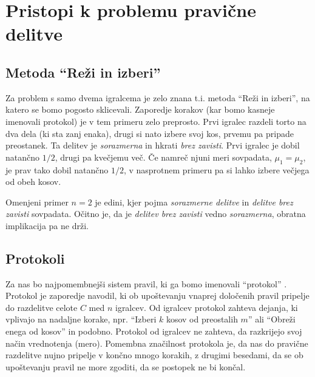 \documentclass[a4paper,12pt]{article}
\begin{document}
\section{Pristopi k problemu pravične delitve}

\subsection{Metoda ``Reži in izberi''}

Za problem s samo dvema igralcema je zelo znana t.i. metoda ``Reži in izberi'', na katero se bomo pogosto sklicevali. Zaporedje korakov (kar bomo kasneje imenovali protokol) je v tem primeru zelo preprosto. Prvi igralec razdeli torto na dva dela (ki sta zanj enaka), drugi si nato izbere svoj kos, prvemu pa pripade preostanek. Ta delitev je {\em sorazmerna\/} in hkrati {\em brez zavisti\/}. Prvi igralec je dobil natančno $1/2$, drugi pa kvečjemu več. Če namreč njuni meri sovpadata, $\mu_1 = \mu_2$, je prav tako dobil natančno $1/2$, v nasprotnem primeru pa si lahko izbere večjega od obeh kosov.

Omenjeni primer $n = 2$ je edini, kjer pojma {\em sorazmerne delitve\/} in {\em delitve brez zavisti\/} sovpadata. Očitno je, da je {\em delitev brez zavisti\/} vedno {\em sorazmerna\/}, obratna implikacija pa ne drži.

%
%
%

\subsection{Protokoli}

Za nas bo najpomembnejši sistem pravil, ki ga bomo imenovali ``protokol''  %
. Protokol je zaporedje navodil, ki ob upoštevanju vnaprej določenih pravil pripelje do razdelitve celote $C$ med $n$ igralcev. Od igralcev protokol zahteva dejanja, ki vplivajo na nadaljne korake, npr. ``Izberi $k$ kosov od preostalih $m$'' ali ``Obreži enega od kosov'' in podobno. Protokol od igralcev ne zahteva, da razkrijejo svoj način vrednotenja (mero). Pomembna značilnost protokola je, da nas do pravične razdelitve nujno pripelje v končno mnogo korakih, z drugimi besedami, da se ob upoštevanju pravil ne more zgoditi, da se postopek ne bi končal.
\end{document}
